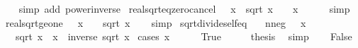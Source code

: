 \begin{isabellebody}
%
\isadelimproof
\ \ %
\endisadelimproof
%
\isatagproof
{}\isamarkupfalse%
\ {\isacharparenleft}{\kern0pt}simp\ add{\isacharcolon}{\kern0pt}\ power{\isacharunderscore}{\kern0pt}inverse{\isacharparenright}{\kern0pt}%
\endisatagproof
{\isafoldproof}%
%
\isadelimproof
\isanewline
%
\endisadelimproof
\isanewline
{}\isamarkupfalse%
\ real{\isacharunderscore}{\kern0pt}sqrt{\isacharunderscore}{\kern0pt}eq{\isacharunderscore}{\kern0pt}zero{\isacharunderscore}{\kern0pt}cancel{\isacharcolon}{\kern0pt}\ {\isachardoublequoteopen}{}\ {\isasymle}\ x\ {\isasymLongrightarrow}\ sqrt\ x\ {\isacharequal}{\kern0pt}\ {}\ {\isasymLongrightarrow}\ x\ {\isacharequal}{\kern0pt}\ {}{\isachardoublequoteclose}\isanewline
%
\isadelimproof
\ \ %
\endisadelimproof
%
\isatagproof
{}\isamarkupfalse%
\ simp%
\endisatagproof
{\isafoldproof}%
%
\isadelimproof
\isanewline
%
\endisadelimproof
\isanewline
{}\isamarkupfalse%
\ real{\isacharunderscore}{\kern0pt}sqrt{\isacharunderscore}{\kern0pt}ge{\isacharunderscore}{\kern0pt}one{\isacharcolon}{\kern0pt}\ {\isachardoublequoteopen}{}\ {\isasymle}\ x\ {\isasymLongrightarrow}\ {}\ {\isasymle}\ sqrt\ x{\isachardoublequoteclose}\isanewline
%
\isadelimproof
\ \ %
\endisadelimproof
%
\isatagproof
{}\isamarkupfalse%
\ simp%
\endisatagproof
{\isafoldproof}%
%
\isadelimproof
\isanewline
%
\endisadelimproof
\isanewline
{}\isamarkupfalse%
\ sqrt{\isacharunderscore}{\kern0pt}divide{\isacharunderscore}{\kern0pt}self{\isacharunderscore}{\kern0pt}eq{\isacharcolon}{\kern0pt}\isanewline
\ \ \ nneg{\isacharcolon}{\kern0pt}\ {\isachardoublequoteopen}{}\ {\isasymle}\ x{\isachardoublequoteclose}\isanewline
\ \ \ {\isachardoublequoteopen}sqrt\ x\ {\isacharslash}{\kern0pt}\ x\ {\isacharequal}{\kern0pt}\ inverse\ {\isacharparenleft}{\kern0pt}sqrt\ x{\isacharparenright}{\kern0pt}{\isachardoublequoteclose}\isanewline
%
\isadelimproof
%
\endisadelimproof
%
\isatagproof
{}\isamarkupfalse%
\ {\isacharparenleft}{\kern0pt}cases\ {\isachardoublequoteopen}x\ {\isacharequal}{\kern0pt}\ {}{\isachardoublequoteclose}{\isacharparenright}{\kern0pt}\isanewline
\ \ \isamarkupfalse%
\ True\isanewline
\ \ \isamarkupfalse%
\ \isamarkupfalse%
\ {\isacharquery}{\kern0pt}thesis\ \isamarkupfalse%
\ simp\isanewline
{}\isamarkupfalse%
\isanewline
\ \ \isamarkupfalse%
\ False\isanewline

\end{isabellebody}

